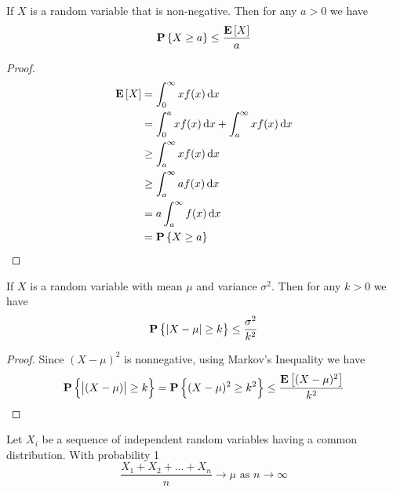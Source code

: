 \begin{theorem}
If $X$ is a random variable that is non-negative. Then for any $a > 0$ we have 
\begin{equation}
    \mathop{\bf P\/}\left\{X \geq a\right\} \leq \frac{\mathop{\bf E\/} \left[ X \right]}{a}
\end{equation}    
\end{theorem}
\begin{proof}
    \begin{equation*}
        \begin{aligned}
            \expect{X} &= \int_0^\infty x f(x) \dif{x} \\
            &= \int_0^a x f(x) \dif{x} + \int_a^\infty x f(x) \dif{x} \\
            & \geq \int_a^\infty x f(x) \dif{x} \\
            & \geq \int_a^\infty a f(x) \dif{x} \\
            &= a \int_a^\infty f(x) \dif{x} \\
            &= \probability{X \geq a}
        \end{aligned}
    \end{equation*}
\end{proof}

\begin{theorem}
    If $X$ is a random variable with mean $\mu$ and variance $\sigma^2$. Then for any $k > 0$ we have
    \begin{equation}
        \mathop{\bf P\/}\left\{\left\lvert X - \mu \right\rvert \geq k \right\} \leq \frac{\sigma^2}{k^2}
    \end{equation}
\end{theorem}
\begin{proof}
    Since $(X - \mu)^2$ is nonnegative, using Markov's Inequality we have
    \begin{equation*}
        \mathop{\bf P\/}\left\{\left\lvert (X - \mu) \right\rvert \geq k\right\} = \mathop{\bf P\/}\left\{(X - \mu)^2 \geq k^2\right\} \leq \frac{\mathop{\bf E\/} \left[ (X-\mu)^2 \right]}{k^2}
    \end{equation*}
\end{proof}

\begin{theorem}
    Let $X_i$ be a sequence of independent random variables having a common distribution. With probability 1
    \begin{equation}
        \frac{X_1 + X_2 + \dots + X_n}{n} \rightarrow \mu \text{ as } n \rightarrow \infty
    \end{equation}
\end{theorem}

